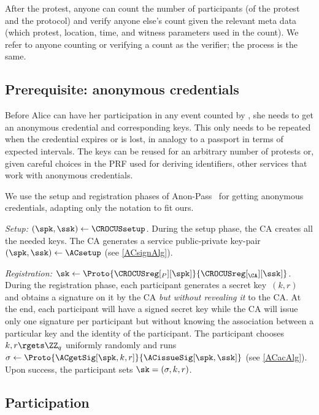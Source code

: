 After the protest, anyone can count the number of participants (of the protest and the
protocol) and verify anyone else's count given the relevant meta data
(which protest, location, time, and witness parameters used in the
count). We refer to anyone counting or verifying a count as the
verifier; the process is the same. 

\subsection{Prerequisite: anonymous credentials}%
\label{ProtocolSetup}

Before Alice can have her participation in any event counted by
\CROCUS, she needs to get an anonymous credential and corresponding
keys. This only needs to be repeated when the credential expires or is
lost, in analogy to a passport in terms of expected intervals. The
keys can be reused for an arbitrary number of protests or, given
careful choices in the PRF used for deriving identifiers, other
services that work with anonymous credentials. 

We use the setup and registration phases of Anon-Pass~\cite{AnonPass} for
getting anonymous credentials, adapting only the notation to fit ours. 


\emph{Setup: \((\spk, \ssk)\gets \CROCUSsetup\).}
During the setup phase, the \ac{CA} creates all the needed keys.
The \ac{CA} generates a service public-private key-pair \((\spk, \ssk)\gets 
  \ACsetup\) (see \cref{ACsignAlg}).

\emph{Registration: \(\sk\gets 
    \Proto{\CROCUSreg[_P][\spk]}{\CROCUSreg[_{\CA}][\ssk]}\).}
During the registration phase, each participant generates a secret key~\((k, 
  r)\) and obtains a signature on it by the \ac{CA} \emph{but without revealing 
  it} to the \ac{CA}.
At the end, each participant will have a signed secret key while the \ac{CA} 
will issue only one signature per participant but without knowing the 
association between a particular key and the identity of the participant.
The participant chooses \(k, r\rgets \ZZ_q\) uniformly randomly and runs 
\(\sigma \gets \Proto{\ACgetSig[\spk, k, r]}{\ACissueSig[\spk, \ssk]}\) (see 
\cref{ACacAlg}).
Upon success, the participant sets \(\sk = (\sigma, k, r)\).



\subsection{Participation}%
\label{ProtocolDuring}


